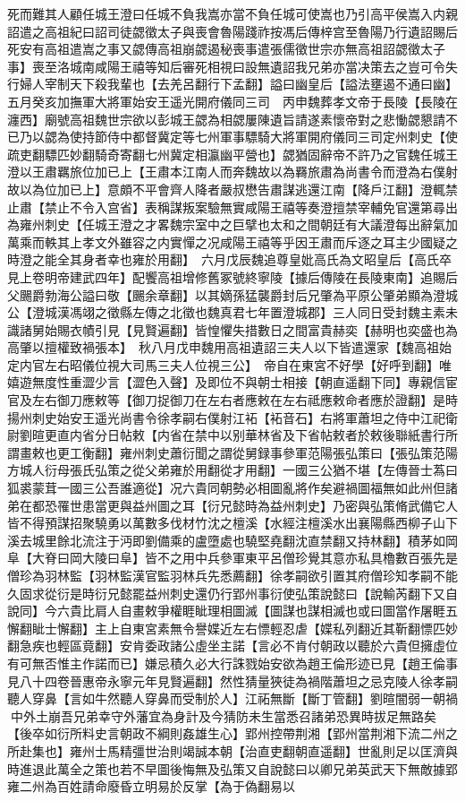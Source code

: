 死而難其人顧任城王澄曰任城不負我嵩亦當不負任城可使嵩也乃引高平侯嵩入内親詔遣之高祖紀曰詔司徒勰徵太子與喪會魯陽踐祚按馮后傳梓宫至魯陽乃行遺詔賜后死安有高祖遣嵩之事又勰傳高祖崩勰遏秘喪事遣張儒徵世宗亦無高祖詔勰徵太子事】喪至洛城南咸陽王禧等知后審死相視曰設無遺詔我兄弟亦當决策去之豈可令失行婦人宰制天下殺我輩也【去羌呂翻行下孟翻】謚曰幽皇后【謚法壅遏不通曰幽】　五月癸亥加撫軍大將軍始安王遥光開府儀同三司　丙申魏葬孝文帝于長陵【長陵在瀍西】廟號高祖魏世宗欲以彭城王勰為相勰屢陳遺旨請遂素懷帝對之悲慟勰懇請不已乃以勰為使持節侍中都督冀定等七州軍事驃騎大將軍開府儀同三司定州刺史【使疏吏翻驃匹妙翻騎奇寄翻七州冀定相瀛幽平營也】勰猶固辭帝不許乃之官魏任城王澄以王肅羈旅位加已上【王肅本江南人而奔魏故以為羇旅肅為尚書令而澄為右僕射故以為位加已上】意頗不平會齊人降者嚴叔懋告肅謀逃還江南【降戶江翻】澄輒禁止肅【禁止不令入宫省】表稱謀叛案驗無實咸陽王禧等奏澄擅禁宰輔免官還第尋出為雍州刺史【任城王澄之才畧魏宗室中之巨擘也太和之間朝廷有大議澄每出辭氣加萬乘而軼其上孝文外雖容之内實憚之况咸陽王禧等乎因王肅而斥逐之耳主少國疑之時澄之能全其身者幸也雍於用翻】　六月戊辰魏追尊皇妣高氏為文昭皇后【高氏卒見上卷明帝建武四年】配饗高祖增修舊冢號終寧陵【據后傳陵在長陵東南】追賜后父颺爵勃海公謚曰敬【颺余章翻】以其嫡孫猛襲爵封后兄肇為平原公肇弟顯為澄城公【澄城漢馮翊之徵縣左傳之北徵也魏真君七年置澄城郡】三人同日受封魏主素未識諸舅始賜衣幘引見【見賢遍翻】皆惶懼失措數日之間富貴赫奕【赫明也奕盛也為高肇以擅權致禍張本】　秋八月戊申魏用高祖遺詔三夫人以下皆遣還家【魏高祖始定内官左右昭儀位視大司馬三夫人位視三公】　帝自在東宮不好學【好呼到翻】唯嬉遊無度性重澀少言【澀色入聲】及即位不與朝士相接【朝直遥翻下同】專親信宦官及左右御刀應敕等【御刀捉御刀在左右者應敕在左右祗應敕命者應於證翻】是時揚州刺史始安王遥光尚書令徐孝嗣右僕射江袥【袥音石】右將軍蕭坦之侍中江祀衛尉劉暄更直内省分日帖敕【内省在禁中以别華林省及下省帖敕者於敕後聯紙書行所謂畫敕也更工衡翻】雍州刺史蕭衍聞之謂從舅録事參軍范陽張弘策曰【張弘策范陽方城人衍母張氏弘策之從父弟雍於用翻從才用翻】一國三公猶不堪【左傳晉士蒍曰狐裘蒙茸一國三公吾誰適從】况六貴同朝勢必相圖亂將作矣避禍圖福無如此州但諸弟在都恐罹世患當更與益州圖之耳【衍兄懿時為益州刺史】乃密與弘策脩武備它人皆不得預謀招聚驍勇以萬數多伐材竹沈之檀溪【水經注檀溪水出襄陽縣西柳子山下溪去城里餘北流注于沔即劉備乘的盧墮處也驍堅堯翻沈直禁翻又持林翻】積茅如岡阜【大脊曰岡大陵曰阜】皆不之用中兵參軍東平呂僧珍覺其意亦私具櫓數百張先是僧珍為羽林監【羽林監漢官監羽林兵先悉薦翻】徐孝嗣欲引置其府僧珍知孝嗣不能久固求從衍是時衍兄懿罷益州刺史還仍行郢州事衍使弘策說懿曰【說輸芮翻下又自說同】今六貴比肩人自畫敕爭權睚眦理相圖滅【圖謀也謀相滅也或曰圖當作屠睚五懈翻眦士懈翻】主上自東宮素無令譽媟近左右慓輕忍虐【媟私列翻近其靳翻慓匹妙翻急疾也輕區竟翻】安肯委政諸公虛坐主諾【言必不肯付朝政以聽於六貴但擁虛位有可無否惟主作諾而已】嫌忌積久必大行誅戮始安欲為趙王倫形迹已見【趙王倫事見八十四卷晉惠帝永寧元年見賢遍翻】然性猜量狹徒為禍階蕭坦之忌克陵人徐孝嗣聽人穿鼻【言如牛然聽人穿鼻而受制於人】江祏無斷【斷丁管翻】劉暄闇弱一朝禍中外土崩吾兄弟幸守外藩宜為身計及今猜防未生當悉召諸弟恐異時拔足無路矣【後卒如衍所料史言朝政不綱則姦雄生心】郢州控帶荆湘【郢州當荆湘下流二州之所赴集也】雍州士馬精彊世治則竭誠本朝【治直吏翻朝直遥翻】世亂則足以匡濟與時進退此萬全之策也若不早圖後悔無及弘策又自說懿曰以卿兄弟英武天下無敵據郢雍二州為百姓請命廢昏立明易於反掌【為于偽翻易以